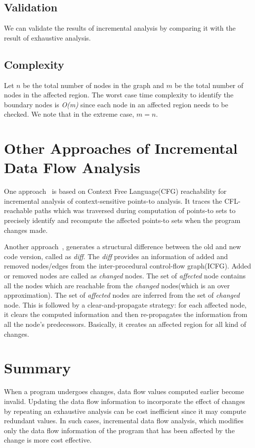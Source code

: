 \documentclass[11pt,a4paper,openright]{report}
\begin{document}

\subsection{Validation}
We can validate the results of incremental analysis by comparing it with the result of exhaustive analysis. 


\subsection{Complexity}
Let $n$ be the total number of nodes in the graph and $m$ be the total number of nodes in the affected region.
The worst case time complexity to identify the boundary nodes is \textit{O(m)} since each node in an affected region needs
to be checked.
We note that in the extreme case, $m = n$.

\section{Other Approaches of Incremental Data Flow Analysis}
One approach~\cite{inc1} is based on Context Free Language(CFG) reachability for incremental analysis of context-sensitive points-to analysis. It traces the CFL-reachable
paths which was traversed during computation of points-to sets to precisely identify and recompute the affected points-to sets when the program changes made. 

Another approach~\cite{inc2}, generates a structural difference between the old and new code version, called as \textit{diff}. The \textit{diff} 
provides an information of added and removed nodes/edges from the inter-procedural control-flow graph(ICFG). Added or removed nodes are called as
\textit{changed} nodes. The set of \textit{affected} node contains all the nodes which are reachable from the \textit{changed} nodes(which is an over approximation). The set of \textit{affected} nodes are inferred from the set of \textit{changed} node. 
This is followed by a clear-and-propagate strategy: for each affected node, it clears the  computed information
and then re-propagates the information from all the node’s predecessors. Basically, it creates an affected region for all kind of changes.

\section{Summary}
When a program undergoes changes, data flow values computed earlier become invalid. Updating the data flow information to incorporate the effect
of changes by repeating an exhaustive analysis can be cost inefficient since it may compute redundant values. In such cases, incremental data flow
analysis, which modifies only the data flow information of the program that has been affected by the change is more cost effective.
\end{document}
